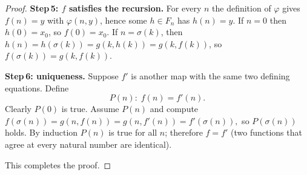 \begin{proof}
	\textbf{Step 5: $f$ satisfies the recursion.}
	For every $n$ the definition of $\varphi$ gives
	$f(n)=y$ with $\varphi(n,y)$, hence some $h\in F_{n}$ has $h(n)=y$.
	If $n=0$ then $h(0)=x_{0}$, so $f(0)=x_{0}$.
	If $n=\sigma(k)$, then $h(n)=h(\sigma(k))=g(k,h(k))=g(k,f(k))$,
	so $f(\sigma(k))=g(k,f(k))$.
	
	\textbf{Step 6: uniqueness.}
	Suppose $f'$ is another map with the same two defining equations.
	Define  
	\[
	P(n):\; f(n)=f'(n).
	\]
	Clearly $P(0)$ is true.  
	Assume $P(n)$ and compute
	\(
	f(\sigma(n))=g(n,f(n))=g(n,f'(n))=f'(\sigma(n)),
	\)
	so $P(\sigma(n))$ holds.  
	By induction $P(n)$ is true for all $n$; therefore $f=f'$ (two
	functions that agree at every natural number are identical).
	
	This completes the proof.
\end{proof}

\fi 

